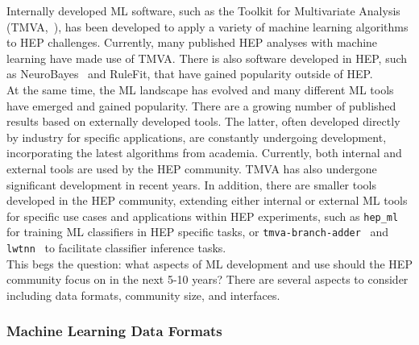 Internally developed ML software, such as the Toolkit for Multivariate Analysis (TMVA,~\cite{TMVA}), has been developed to apply a variety of machine learning algorithms to HEP challenges. Currently, many published HEP analyses with machine learning have made use of TMVA. There is also software developed in HEP, such as NeuroBayes~\cite{neurobayes,neurobayes2} and RuleFit, that have gained popularity outside of HEP.\\

At the same time, the ML landscape has evolved and many different ML tools have emerged and gained popularity. There are a growing number of published results based on externally developed tools. The latter, often developed directly by industry for specific applications, are constantly undergoing development, incorporating the latest algorithms from academia. Currently, both internal and external tools are used by the HEP community. TMVA has also undergone significant development in recent years.
In addition, there are smaller tools developed in the HEP community, extending either internal or external ML tools for specific use cases and applications within HEP experiments, such as \texttt{hep\_ml}~\cite{hep_ml} for training ML classifiers in HEP specific tasks, or \texttt{tmva-branch-adder}~\cite{tmva-branch-adder} and \texttt{lwtnn}~\cite{lwtnn} to facilitate classifier inference tasks.\\

This begs the question: what aspects of ML development and use should the HEP community focus on in the next 5-10 years? There are several aspects to consider including data formats, community size, and interfaces.

\subsubsection{Machine Learning Data Formats}\label{sec:data_formats}

